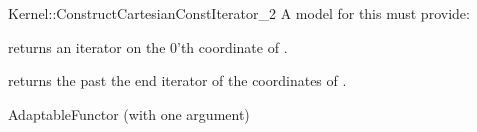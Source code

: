 \begin{ccRefFunctionObjectConcept}{Kernel::ConstructCartesianConstIterator_2}
A model for this must provide:



 {returns an iterator on the 0'th   coordinate of .}

 {returns the past the end iterator of the   coordinates of .}




\ccRefines
AdaptableFunctor (with one argument)

\ccSeeAlso
{} \\

\end{ccRefFunctionObjectConcept}
